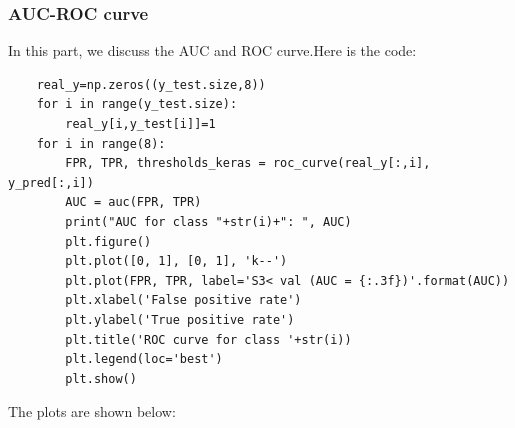 \documentclass[conference]{IEEEtran}
\begin{document}
\subsubsection{AUC-ROC curve}
In this part, we discuss the AUC and ROC curve.Here is the code:
\begin{lstlisting}
    real_y=np.zeros((y_test.size,8))
    for i in range(y_test.size):
        real_y[i,y_test[i]]=1
    for i in range(8):
        FPR, TPR, thresholds_keras = roc_curve(real_y[:,i], y_pred[:,i]) 
        AUC = auc(FPR, TPR)  
        print("AUC for class "+str(i)+": ", AUC)
        plt.figure()
        plt.plot([0, 1], [0, 1], 'k--')
        plt.plot(FPR, TPR, label='S3< val (AUC = {:.3f})'.format(AUC))
        plt.xlabel('False positive rate')
        plt.ylabel('True positive rate')
        plt.title('ROC curve for class '+str(i))
        plt.legend(loc='best')
        plt.show()    
\end{lstlisting}

The plots are shown below:
\end{document}
